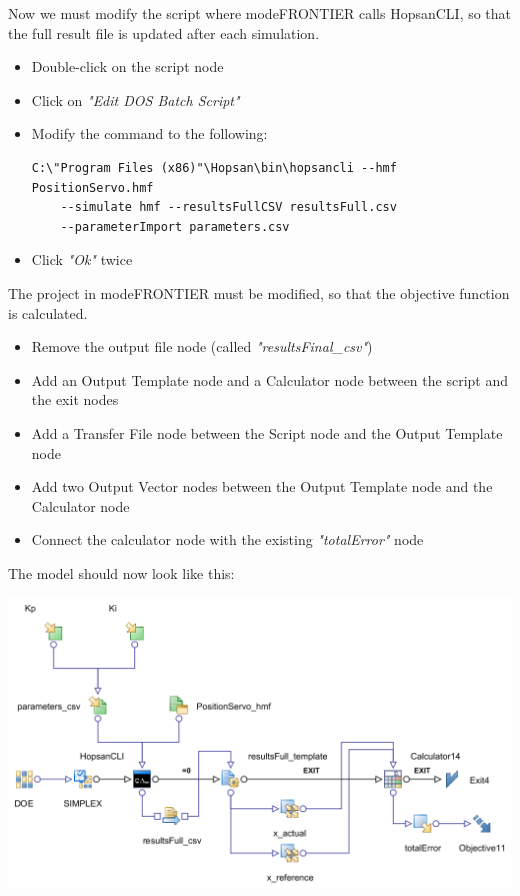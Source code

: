 \documentclass[a4paper]{article}
\begin{document}
\begin{tutenumerate}
\begin{enumerate}
Now we must modify the script where modeFRONTIER calls HopsanCLI, so that the full result file is updated after each simulation.
\begin{itemize}
\item Double-click on the script node


\item Click on \textit{"Edit DOS Batch Script"}
\item Modify the command to the following:
\begin{lstlisting}[basicstyle=\footnotesize\ttfamily, breaklines=true]
C:\"Program Files (x86)"\Hopsan\bin\hopsancli --hmf PositionServo.hmf
    --simulate hmf --resultsFullCSV resultsFull.csv 
    --parameterImport parameters.csv
\end{lstlisting}
\item Click \textit{"Ok"} twice
\end{itemize}

The project in modeFRONTIER must be modified, so that the objective function is calculated. 
\begin{itemize}
\item Remove the output file node (called \textit{"resultsFinal\_csv"})
\item Add an Output Template node and a Calculator node between the script and the exit nodes
\item Add a Transfer File node between the Script node and the Output Template node
\item Add two Output Vector nodes between the Output Template node and the Calculator node
\item Connect the calculator node with the existing \textit{"totalError"} node
\end{itemize}

The model should now look like this:

\begin{center}
\includegraphics[scale=0.52]{gfx/modefrontier/model_full.png}
\end{center}



\end{enumerate}
\end{tutenumerate}
\end{document}
